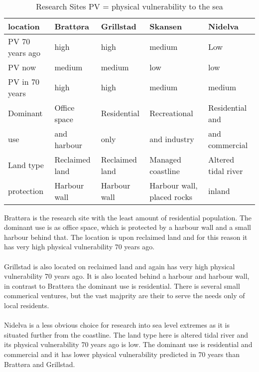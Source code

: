 \paragraph{}
\begin{table}[!ht]
    \centering
    \begin{tabular}{|l|l|l|l|l|}
    \hline
        location & Brattøra & Grillstad & Skansen  & Nidelva \\ \hline
        PV 70 years ago & high & high & medium & Low \\ \hline
        PV now &  medium &  medium &  low &  low \\ \hline
        PV in 70 years &  high &  high &  medium &  medium \\ \hline
        Dominant & Office space  & Residential & Recreational  & Residential and \\ \newline
        use & and harbour &  only   &  and industry & and commercial  \\ \hline
        Land type & Reclaimed land & Reclaimed land & Managed coastline  & Altered tidal river \\ \hline
        protection & Harbour wall & Harbour wall & Harbour wall, placed rocks & inland \\ \hline
    \end{tabular}
    \caption{Research Sites PV = physical vulnerability to the sea}
    \label{table:research-sites}
\end{table}

Brattøra is the research site with the least amount of residential population. The dominant use is as office space, which is protected by a harbour wall and a small harbour behind that. The location is upon reclaimed land and for this reason it has very high physical vulnerability 70 years ago. 
\paragraph{}
Grillstad is also located on reclaimed land and again has very high physical vulnerability 70 years ago. It is also located behind a harbour and harbour wall, in contrast to  Brattøra the dominant use is residential. There is several small commerical ventures, but the vast majprity are their to serve the needs only of local residents. 
\paragraph{}
Nidelva is a less obvious choice for research into sea level extremes as it is situated further from the coastline. The land type here is altered tidal river and its physical vulnerability 70 years ago is low. The dominant use is residential and commercial and it has lower physical vulnerability predicted in 70 years than Brattøra and Grillstad. 
